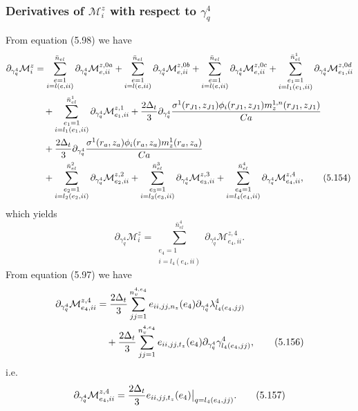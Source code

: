 \documentclass{article}
\begin{document}
\subsubsection{Derivatives of $\mathcal{M}_i^z$ with respect to $\gamma_q^4$} %
From equation (5.98) we have
\begin{align}
\partial_{\gamma_q^4}\mathcal{M}_i^z &= \sum_{\substack{e=1\\ i=l(e,ii)}}^{\bar{n}_{el}} \partial_{\gamma_q^4} \mathcal{M}_{e,ii}^{z,0a} + \sum_{\substack{e=1\\ i=l(e,ii)}}^{\bar{n}_{el}} \partial_{\gamma_q^4} \mathcal{M}_{e,ii}^{z,0b} + \sum_{\substack{e=1\\ i=l(e,ii)}}^{\bar{n}_{el}} \partial_{\gamma_q^4} \mathcal{M}_{e,ii}^{z,0c} + \sum_{\substack{e_1=1\\ i=l_1(e_1,ii)}}^{\bar{n}_{el}^1} \partial_{\gamma_q^4} \mathcal{M}_{e_1,ii}^{z,0d} \nonumber\\
&\quad + \sum_{\substack{e_1=1\\ i=l_1(e_1,ii)}}^{\bar{n}_{el}^1} \partial_{\gamma_q^4} \mathcal{M}_{e_1,ii}^{z,1} + \frac{2\Delta_t}{3} \partial_{\gamma_q^4} \frac{\sigma^1(r_{J1},z_{J1}) \phi_i(r_{J1},z_{J1}) m_z^{1,n}(r_{J1},z_{J1})}{Ca} \nonumber\\
&\quad + \frac{2\Delta_t}{3} \partial_{\gamma_q^4} \frac{\sigma^1(r_a,z_a) \phi_i(r_a,z_a) m_z^{1}(r_a,z_a)}{Ca} \nonumber\\
&\quad + \sum_{\substack{e_2=1\\ i=l_2(e_2,ii)}}^{\bar{n}_{el}^2} \partial_{\gamma_q^4} \mathcal{M}_{e_2,ii}^{z,2} + \sum_{\substack{e_3=1\\ i=l_3(e_3,ii)}}^{\bar{n}_{el}^3} \partial_{\gamma_q^4} \mathcal{M}_{e_3,ii}^{z,3} + \sum_{\substack{e_4=1\\ i=l_4(e_4,ii)}}^{\bar{n}_{el}^4} \partial_{\gamma_q^4} \mathcal{M}_{e_4,ii}^{z,4}, \tag{5.154}
\end{align}
which yields
\begin{equation}
\partial_{\gamma_q^4}\mathcal{M}_i^z = \sum_{\substack{e_4=1\\ i=l_4(e_4,ii)}}^{\bar{n}_{el}^4} \partial_{\gamma_q^4} \mathcal{M}_{e_4,ii}^{z,4}. \tag{5.155}
\end{equation}
From equation (5.97) we have
\begin{align}
\partial_{\gamma_q^4}\mathcal{M}_{e_4,ii}^{z,4} &= \frac{2\Delta_t}{3} \sum_{jj=1}^{n_v^{4,e_4}} e_{ii,jj,n_z}(e_4) \partial_{\gamma_q^4} \lambda_{l_4(e_4,jj)}^4 \nonumber\\
&\quad + \frac{2\Delta_t}{3} \sum_{jj=1}^{n_v^{4,e_4}} e_{ii,jj,t_z}(e_4) \partial_{\gamma_q^4} \gamma_{l_4(e_4,jj)}^4, \tag{5.156}
\end{align}
i.e.
\begin{equation}
\partial_{\gamma_q^4}\mathcal{M}_{e_4,ii}^{z,4} = \frac{2\Delta_t}{3} e_{ii,jj,t_z}(e_4) \big|_{q=l_4(e_4,jj)}. \tag{5.157}
\end{equation}
\end{document}
